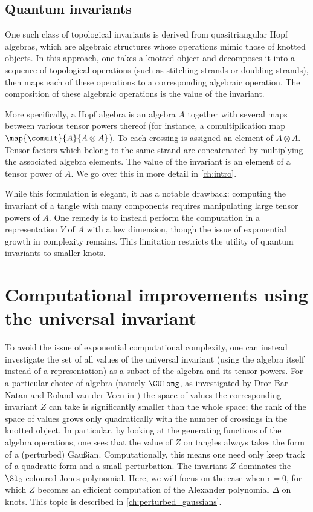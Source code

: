 \subsection{Quantum invariants}

One such class of topological invariants is derived from quasitriangular Hopf
algebras, which are algebraic structures whose operations mimic those of knotted
objects. In this approach, one takes a knotted object and decomposes it into a
sequence of topological operations (such as stitching strands or doubling
strands), then maps each of these operations to a corresponding algebraic
operation. The composition of these algebraic operations is the value of the
invariant.

More specifically, a Hopf algebra is an algebra $A$ together with several maps
between various tensor powers thereof (for instance, a comultiplication map
$\map {\comult} {A} {A \otimes A}$). To each crossing is assigned an element of
$A \otimes A$. Tensor factors which belong to the same strand are concatenated
by multiplying the associated algebra elements. The value of the invariant is an
element of a tensor power of $A$. We go over this in more detail in
\cref{ch:intro}.

While this formulation is elegant, it has a notable drawback: computing the
invariant of a tangle with many components requires manipulating
large tensor powers of $A$. One remedy is to instead perform the computation in
a representation $V$ of $A$ with a low dimension, though the issue of
exponential growth in complexity remains. This limitation restricts the utility
of quantum invariants to smaller knots.

\section{Computational improvements using the universal invariant}
To avoid the issue of exponential computational complexity, one can instead
investigate the set of all values of the universal invariant (using the algebra
itself instead of a representation) as a subset of the algebra and its tensor
powers. For a particular choice of algebra (namely $\CUlong$, as investigated by
Dror Bar-Natan and Roland van der Veen in \cite{BV}) the space of values the
corresponding invariant $Z$ can take is significantly smaller than the whole
space; the rank of the space of values grows only quadratically with the number
of crossings in the knotted object. In particular, by looking at the generating
functions of the algebra operations, one sees that the value of $Z$ on tangles
always takes the form of a (perturbed) Gaußian. Computationally, this means one
need only keep track of a quadratic form and a small perturbation. The invariant
$Z$ dominates the $\Sl_2$-coloured Jones polynomial. Here, we will focus on the
case when $ϵ=0$, for which $Z$ becomes an efficient computation of the Alexander
polynomial $Δ$ on knots. This topic is described in
\cref{ch:perturbed_gaussians}.

